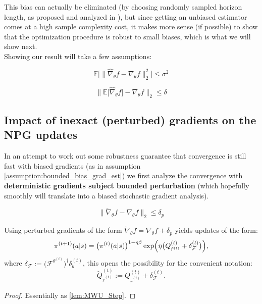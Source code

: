 This bias can actually be eliminated (by choosing randomly sampled horizon length, as proposed and analyzed in \cite{DingY2021}), but since getting an unbiased estimator comes at a high sample complexity cost, it makes more sense (if possible) to show that the optimization procedure is robust to small biases, which is what we will show next. \\

\noindent
Showing our result will take a few assumptions:

\begin{assumption}
    \label{assumption:bounded_var_grad_est}
    \[ \mathbb{E}\Big[ \| \hat{\nabla}_\theta f - {\nabla}_\theta f  \|_2^2 \Big] \leq \sigma^2 \]
\end{assumption}

\begin{assumption}
    \label{assumption:bounded_bias_grad_est}
    \[  \| \mathbb{E}\big[ \hat{\nabla}_\theta f \big]- {\nabla}_\theta f  \|_2 \leq \delta \]
\end{assumption}

\subsection{Impact of inexact (perturbed) gradients on the NPG updates}

In an attempt to work out some robustness guarantee that convergence is still fast with biased gradients (as in assumption \ref{assumption:bounded_bias_grad_est}) we first analyze the convergence with \textbf{deterministic gradients subject bounded  perturbation} (which hopefully smoothly will translate into a biased stochastic gradient analysis). 

\begin{assumption}
    \label{assumption:bounded_pert_grad}
    \[ \| \breve{\nabla}_\theta f - {\nabla}_\theta f  \|_2 \leq \delta_p \]
\end{assumption}

\begin{lemma}
    \label{lemma:perturbed_policy_updates}
    Using perturbed gradients of the form $\breve{\nabla}_\theta f = {\nabla}_\theta f + \delta_p$ yields updates of the form:
    \[\pi^{(t+1)}(a|s)  = \big(\pi^{(t)}(a|s) \big)^{1-\eta \beta} \exp \Bigl( \eta \bigl( {Q}_{\tilde{r}^{(t)}}^{(t)}   + \delta_\mathcal{F}^{(t)} \bigr) \Bigr), \]
    where $\delta_\mathcal{F}:=\bigl(\mathcal{F}^{\theta^{(t)}}\bigr)^\dagger \delta_b^{(t)}$, this opens the possibility for the convenient notation:
    \[ \breve{Q}_{\tilde{r}^{(t)}}^{(t)}  := {Q}_{\tilde{r}^{(t)}}^{(t)}   + \delta_\mathcal{F}^{(t)}.\]
    \begin{proof}
        Essentially as \ref{lem:MWU_Step}.
    \end{proof}
\end{lemma}

